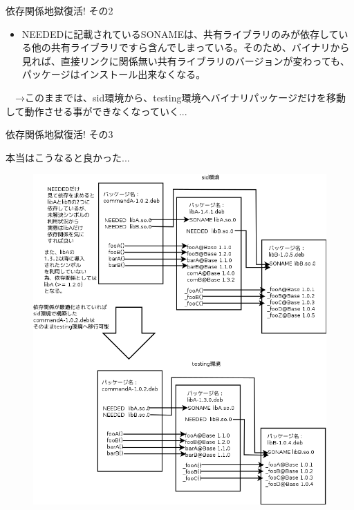 \begin{frame}{依存関係地獄復活! その2}

\begin{itemize}
\item NEEDEDに記載されているSONAMEは、共有ライブラリのみが依存している他の共有ライブラリですら含んでしまっている。そのため、バイナリから見れば、直接リンクに関係無い共有ライブラリのバージョンが変わっても、パッケージはインストール出来なくなる。
\end{itemize}

　→このままでは、sid環境から、testing環境へバイナリパッケージだけを移動して動作させる事ができなくなっていく...

\end{frame}

\begin{frame}{依存関係地獄復活! その3}

 本当はこうなると良かった...
\begin{figure}[ht]
\begin{center}
\includegraphics[scale=0.3]{image201208/symbols-advantage.png}
\end{center}
\end{figure}

\end{frame}

